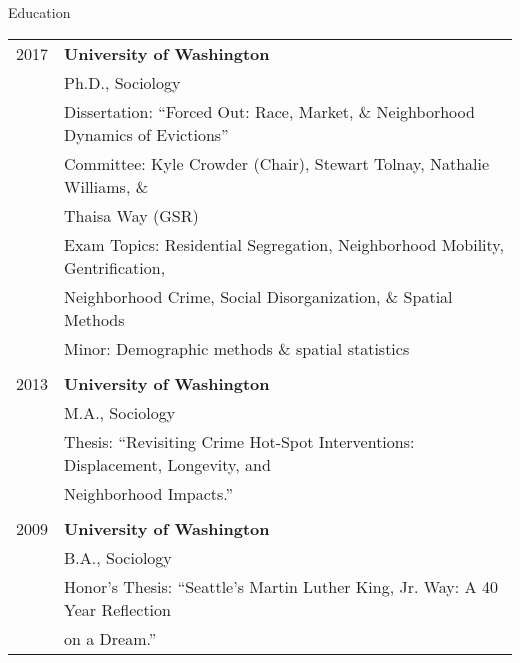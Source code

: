 \documentclass{resume} %
\begin{document}
\begin{rSection}{Education}
\vspace{5mm}
\begin{tabular}{ @{} >{}l @{\hspace{6ex}} l }

2017 	& \textbf{University of Washington}\\
		& Ph.D., Sociology\\
		& Dissertation: ``Forced Out: Race, Market, \& Neighborhood Dynamics of Evictions''\\
		& Committee: Kyle Crowder (Chair), Stewart Tolnay, Nathalie Williams, \&\\
		&\hspace{.79in}Thaisa Way (GSR)\\
		& Exam Topics: Residential Segregation, Neighborhood Mobility, Gentrification,\\
		& \hspace*{.91in}Neighborhood Crime, Social Disorganization, \& Spatial Methods\\
		& Minor: Demographic methods \& spatial statistics\\\\

2013	& \textbf{University of Washington}\\
		& M.A., Sociology\\
		& Thesis: ``Revisiting Crime Hot-Spot Interventions: Displacement, Longevity, and\\
		& \hspace*{.56in}Neighborhood Impacts.''\\\\

2009	& \textbf{University of Washington}\\
		& B.A., Sociology\\
		& Honor's Thesis: ``Seattle's Martin Luther King, Jr. Way: A 40 Year Reflection\\
		& \hspace*{1.12in}on a Dream.''
\end{tabular}
\vspace{5mm}
\end{rSection}

%
%
\end{document}
